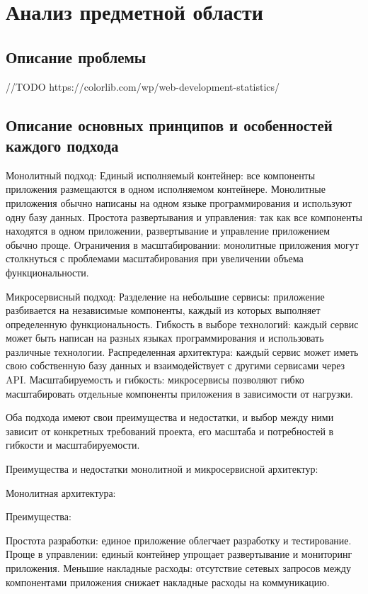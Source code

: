 \section{Анализ предметной области}

\subsection{Описание проблемы}
    //TODO
    https://colorlib.com/wp/web-development-statistics/

\subsection{Описание основных принципов и особенностей каждого подхода}
        Монолитный подход:
        Единый исполняемый контейнер: все компоненты приложения размещаются в одном исполняемом контейнере.
        Монолитные приложения обычно написаны на одном языке программирования и используют одну базу данных.
        Простота развертывания и управления: так как все компоненты находятся в одном приложении, развертывание и управление приложением обычно проще.
        Ограничения в масштабировании: монолитные приложения могут столкнуться с проблемами масштабирования при увеличении объема функциональности.

    Микросервисный подход:
        Разделение на небольшие сервисы: приложение разбивается на независимые компоненты, каждый из которых выполняет определенную функциональность.
        Гибкость в выборе технологий: каждый сервис может быть написан на разных языках программирования и использовать различные технологии.
        Распределенная архитектура: каждый сервис может иметь свою собственную базу данных и взаимодействует с другими сервисами через API.
        Масштабируемость и гибкость: микросервисы позволяют гибко масштабировать отдельные компоненты приложения в зависимости от нагрузки.
        
    Оба подхода имеют свои преимущества и недостатки, и выбор между ними зависит от конкретных требований проекта, его масштаба и потребностей в гибкости и масштабируемости.

    Преимущества и недостатки монолитной и микросервисной архитектур:

    Монолитная архитектура:
    
    Преимущества:
    
        Простота разработки: единое приложение облегчает разработку и тестирование.
        Проще в управлении: единый контейнер упрощает развертывание и мониторинг приложения.
        Меньшие накладные расходы: отсутствие сетевых запросов между компонентами приложения снижает накладные расходы на коммуникацию.
    
